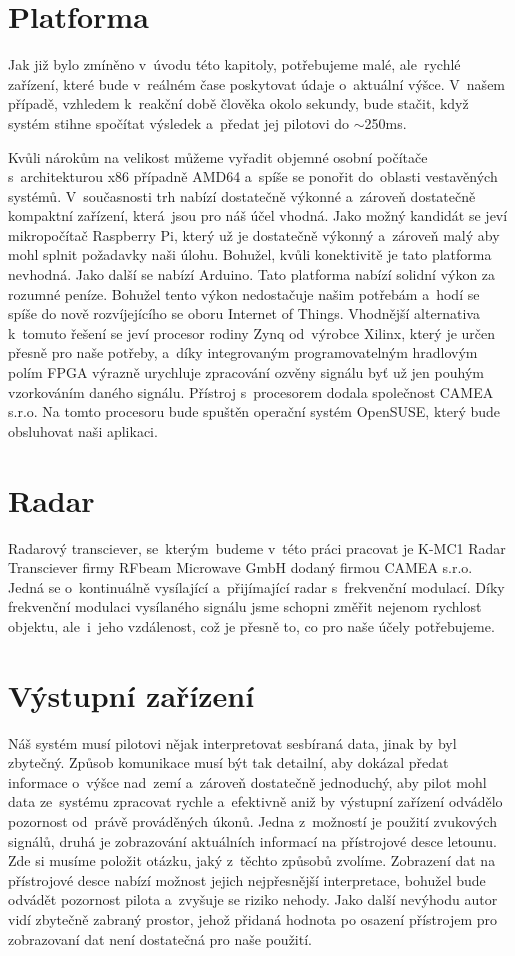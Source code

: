 	\section{Platforma}\label{navrhReseni::platforma}
		Jak již bylo zmíněno v~úvodu této kapitoly, potřebujeme malé, ale~rychlé zařízení, které bude v~reálném čase poskytovat údaje o~aktuální výšce. V~našem případě, vzhledem k~reakční době člověka okolo sekundy, bude stačit, když systém stihne spočítat výsledek a~předat jej pilotovi do $\sim$250ms.\par
		
		Kvůli nárokům na velikost můžeme vyřadit objemné osobní počítače s~architekturou x86 případně AMD64 a~spíše se ponořit do~oblasti vestavěných systémů. V~současnosti trh nabízí dostatečně výkonné a~zároveň dostatečně kompaktní zařízení, která~jsou pro náš účel vhodná. Jako možný kandidát se jeví mikropočítač Raspberry Pi, který už je dostatečně výkonný a~zároveň malý aby mohl splnit požadavky naši úlohu. Bohužel, kvůli konektivitě je tato platforma nevhodná. Jako další se nabízí Arduino. Tato platforma nabízí solidní výkon za rozumné peníze. Bohužel tento výkon nedostačuje našim potřebám a~hodí se spíše do nově rozvíjejícího se oboru Internet of Things. Vhodnější alternativa k~tomuto řešení se jeví procesor rodiny Zynq od~výrobce Xilinx, který je určen přesně pro naše potřeby, a~díky integrovaným programovatelným hradlovým polím FPGA výrazně urychluje zpracování ozvěny signálu byť už jen pouhým vzorkováním daného signálu. Přístroj s~procesorem dodala společnost CAMEA s.r.o. Na tomto procesoru bude spuštěn operační systém OpenSUSE, který bude obsluhovat naši aplikaci.
		
	\section{Radar}
		Radarový transciever, se~kterým~budeme v~této práci pracovat je K-MC1 Radar Transciever firmy RFbeam Microwave GmbH dodaný firmou CAMEA s.r.o. Jedná se o~kontinuálně vysílající a~přijímající radar s~frekvenční modulací. Díky frekvenční modulaci vysílaného signálu jsme schopni změřit nejenom rychlost objektu, ale~i~jeho vzdálenost, což je přesně to, co pro naše účely potřebujeme.
	
	\section{Výstupní zařízení}
		Náš systém musí pilotovi nějak interpretovat sesbíraná data, jinak by byl zbytečný. Způsob komunikace musí být tak detailní, aby dokázal předat informace o~výšce nad~zemí a~zároveň dostatečně jednoduchý, aby pilot mohl data ze~systému zpracovat rychle a~efektivně aniž by výstupní zařízení odvádělo pozornost od~právě prováděných úkonů. Jedna z~možností je použití zvukových signálů, druhá je zobrazování aktuálních informací na přístrojové desce letounu. Zde si musíme položit otázku, jaký z~těchto způsobů zvolíme. Zobrazení dat na přístrojové desce nabízí možnost jejich nejpřesnější interpretace, bohužel bude odvádět pozornost pilota a~zvyšuje se riziko nehody. Jako další nevýhodu autor vidí zbytečně zabraný prostor, jehož přidaná hodnota po osazení přístrojem pro zobrazovaní dat není dostatečná pro naše použití. 
			
